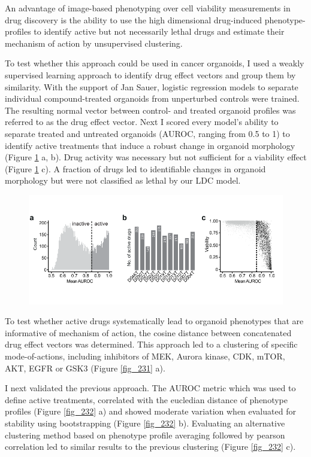 \begin{flushleft}
An advantage of image-based phenotyping over cell viability measurements in drug discovery is the ability to use the high dimensional drug-induced phenotype-profiles to identify active but not necessarily lethal drugs and estimate their mechanism of action by unsupervised clustering. 

\bigbreak
To test whether this approach could be used in cancer organoids, I used a weakly supervised learning approach to identify drug effect vectors and group them by similarity. With the support of Jan Sauer, logistic regression models to separate individual compound-treated organoids from unperturbed controls were trained. The resulting normal vector between control- and treated organoid profiles was referred to as the drug effect vector. Next I scored every model’s ability to separate treated and untreated organoids (AUROC, ranging from 0.5 to 1) to identify active treatments that induce a robust change in organoid morphology (Figure \ref{fig_230} a, b). Drug activity was necessary but not sufficient for a viability effect (Figure \ref{fig_230} c). A fraction of drugs led to identifiable changes in organoid morphology but were not classified as lethal by our LDC model. 

\begin{figure}[h]
\centering
\includegraphics[width=\textwidth,
                height=\textheight,
                keepaspectratio]{figures/promise/pdf/fig_3_0.pdf}
\caption{}
\label{fig_230}
\end{figure}
\bigbreak

To test whether active drugs systematically lead to organoid phenotypes that are informative of mechanism of action, the cosine distance between concatenated drug effect vectors was determined. This approach led to a clustering of specific mode-of-actions, including inhibitors of MEK, Aurora kinase, CDK, mTOR, AKT, EGFR or GSK3 (Figure \ref{fig_231} a). 

\bigbreak
I next validated the previous approach. The AUROC metric which was used to define active treatments, correlated with the eucledian distance of phenotype profiles (Figure \ref{fig_232} a) and showed moderate variation when evaluated for stability using bootstrapping (Figure \ref{fig_232} b). Evaluating an alternative clustering method based on phenotype profile averaging followed by pearson correlation led to similar results to the previous clustering (Figure \ref{fig_232} c). 


\end{flushleft}
